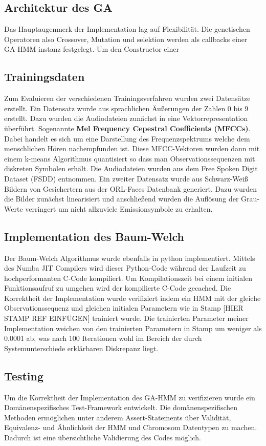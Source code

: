 \subsection*{Architektur des GA}
Das Hauptaugenmerk der Implementation lag auf Flexibilität. Die genetischen Operatoren also Crossover, Mutation und selektion werden als callbacks einer GA-HMM instanz festgelegt. Um den Constructor einer 


\subsection*{Trainingsdaten}
Zum Evaluieren der verschiedenen Trainingsverfahren wurden zwei Datensätze erstellt. Ein Datensatz wurde aus sprachlichen Äußerungen der Zahlen 0 bis 9 erstellt. Dazu wurden die Audiodateien zunächst in eine Vektorrepresentation überführt. Sogenannte \textbf{Mel Frequency Cepestral Coefficients (MFCCs)}. Dabei handelt es sich um eine Darstellung des Frequenzspektrums welche dem menschlichen Hören nachempfunden ist. Diese MFCC-Vektoren wurden dann mit einem k-means Algorithmus quantisiert so dass man Observationssequenzen mit diskreten Symbolen erhält. Die Audiodateien wurden aus dem Free Spoken Digit Dataset (FSDD) entnommen. Ein zweiter Datensatz wurde aus Schwarz-Weiß Bildern von Gesichertern aus der ORL-Faces Datenbank generiert. Dazu wurden die Bilder zunächst linearisiert und anschließend wurden die Auflösung der Grau-Werte verringert um nicht allzuviele Emissionsymbole zu erhalten.

\subsection*{Implementation des Baum-Welch}
Der Baum-Welch Algorithmus wurde ebenfalls in python implementiert. Mittels des Numba JIT Compilers wird dieser Python-Code während der Laufzeit zu hochperformanten C-Code kompiliert. Um Kompilationszeit bei einem initialen Funktionsaufruf zu umgehen wird der kompilierte C-Code gecached. Die Korrektheit der Implementation wurde verifiziert indem ein HMM mit der gleiche Observationssequenz und gleichen initialen Parametern wie in Stamp [HIER STAMP REF EINFÜGEN] trainiert wurde. Die trainierten Parameter meiner Implementation weichen von den trainierten Parametern in Stamp um weniger als 0.0001 ab, was nach 100 Iterationen wohl im Bereich der durch Systemunterschiede erklärbaren Diskrepanz liegt.

\subsection*{Testing}
Um die Korrektheit der Implementation des GA-HMM zu verifizieren wurde ein Domänenspezifisches Test-Framework entwickelt. Die domänenspezifischen Methoden ermöglichen unter anderem Assert-Statements über Validität, Equivalenz- und Ähnlichkeit der HMM und Chromosom Datentypen zu machen. Dadurch ist eine übersichtliche Validierung des Codes möglich.